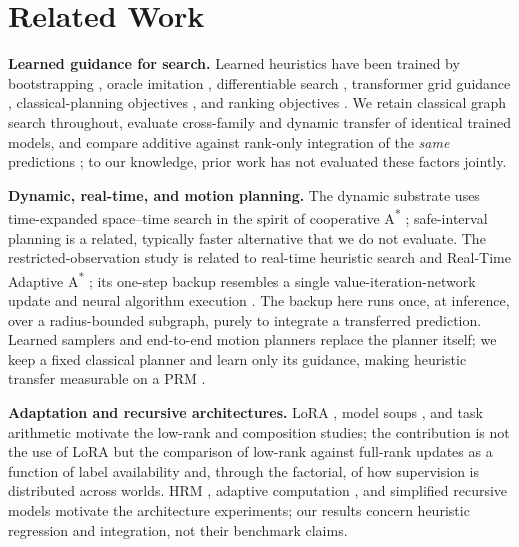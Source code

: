 \documentclass[letterpaper]{article} %
\begin{document}
\section{Related Work}

\textbf{Learned guidance for search.} Learned heuristics have been trained by bootstrapping \citep{arfaee2011bootstrap}, oracle imitation \citep{bhardwaj2017sail}, differentiable search \citep{yonetani2021neuralastar}, transformer grid guidance \citep{kirilenko2023transpath}, classical-planning objectives \citep{ferber2020neural}, and ranking objectives \citep{chrestien2023rank}. We retain classical graph search throughout, evaluate cross-family and dynamic transfer of identical trained models, and compare additive against rank-only integration of the \emph{same} predictions \citep{pohl1970,pearl1982semiadmissible,aine2016mha}; to our knowledge, prior work has not evaluated these factors jointly.

\textbf{Dynamic, real-time, and motion planning.} The dynamic substrate uses time-expanded space--time search in the spirit of cooperative A\textsuperscript{*} \citep{silver2005cooperative}; safe-interval planning \citep{phillips2011sipp} is a related, typically faster alternative that we do not evaluate. The restricted-observation study is related to real-time heuristic search \citep{korf1990rta} and Real-Time Adaptive A\textsuperscript{*} \citep{koenig2006rtaa}; its one-step backup resembles a single value-iteration-network update \citep{tamar2016vin,lee2018gppn} and neural algorithm execution \citep{velickovic2021nar}. The backup here runs once, at inference, over a radius-bounded subgraph, purely to integrate a transferred prediction. Learned samplers and end-to-end motion planners \citep{ichter2018sampling,qureshi2019mpnet} replace the planner itself; we keep a fixed classical planner and learn only its guidance, making heuristic transfer measurable on a PRM \citep{kavraki1996prm}.

\textbf{Adaptation and recursive architectures.} LoRA \citep{hu2021lora}, model soups \citep{wortsman2022soups}, and task arithmetic \citep{ilharco2022task} motivate the low-rank and composition studies; the contribution is not the use of LoRA but the comparison of low-rank against full-rank updates as a function of label availability and, through the factorial, of how supervision is distributed across worlds. HRM \citep{wang2025hrm}, adaptive computation \citep{graves2016act,banino2021pondernet}, and simplified recursive models \citep{jolicoeur2025trm} motivate the architecture experiments; our results concern heuristic regression and integration, not their benchmark claims.
\end{document}
